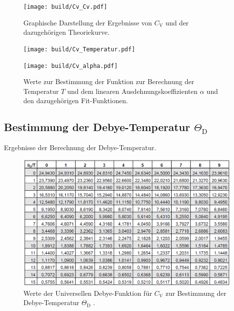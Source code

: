 \begin{figure}
	\centering
	\texttt{[image: build/Cv\_Cv.pdf]}
	\caption[]{Graphische Darstellung der Ergebnisse von $C_\mathrm{V}$ und der dazugehörigen Theoriekurve.}
	\label{Cv_gra}
\end{figure}

\begin{figure}
	\begin{minipage}{8cm}
		\texttt{[image: build/Cv\_Temperatur.pdf]}
	\end{minipage}
	\hfill
	\begin{minipage}{8cm}
		\texttt{[image: build/Cv\_alpha.pdf]}
	\end{minipage}
	\caption[]{Werte zur Bestimmung der Funktion zur Berechnung der Temperatur $T$ und dem linearen Ausdehnungskoeffizienten $\alpha$ und den dazugehörigen Fit-Funktionen.}
\end{figure}

\subsection{Bestimmung der Debye-Temperatur $\Theta_\mathrm{D}$} %
\label{sub:bestimmung_der_debye_temperatur_theta_mathrm}

\begin{table}[!h]
	\centering
	\caption[]{Ergebnisse der Berechnung der Debye-Temperatur.}
	
	\label{Theta_Debye}
\end{table}

\begin{figure}[!h]
	\centering
	\includegraphics[width = 14cm]{img/theta.png}
	\caption[]{Werte der Universellen Debye-Funktion für $C_\mathrm{V}$ zur Bestimmung der Debye-Temperatur $\Theta_\mathrm{D}$ \cite{V47}.}
	\label{Cv_global}
\end{figure}

